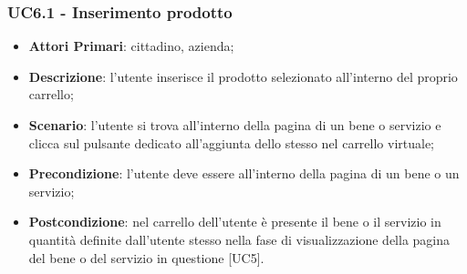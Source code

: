  \subsubsection{UC6.1 - Inserimento prodotto}
\begin{itemize}
	\item \textbf{Attori Primari}: cittadino, azienda\glo;
	\item \textbf{Descrizione}: l'utente inserisce il prodotto selezionato all'interno del proprio carrello;
	\item \textbf{Scenario}: l'utente si trova all'interno della pagina di un bene o servizio e clicca sul pulsante dedicato all'aggiunta dello stesso nel carrello virtuale;
	\item \textbf{Precondizione}: l'utente deve essere all'interno della pagina di un bene o un servizio;
	\item \textbf{Postcondizione}: nel carrello dell'utente è presente il bene o il servizio in quantità definite dall'utente stesso nella fase di visualizzazione della pagina del bene o del servizio in questione [UC5].
\end{itemize}
